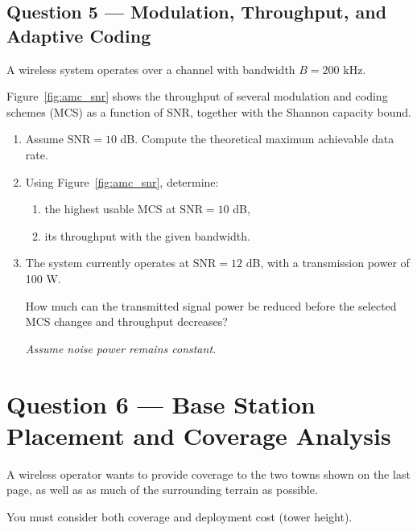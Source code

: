 \documentclass[11pt,a4paper]{article}
\begin{document}
\vspace{0.4cm}

\subsection*{Question 5 --- Modulation, Throughput, and Adaptive Coding}

A wireless system operates over a channel with bandwidth $B = 200$ kHz.

Figure~\ref{fig:amc_snr} shows the throughput of several modulation and coding schemes (MCS) as a function of SNR, together with the Shannon capacity bound.


\FloatBarrier

\begin{enumerate}[label=\alph*)]

\item Assume $\mathrm{SNR} = 10$ dB. Compute the theoretical maximum achievable data rate.

\item Using Figure~\ref{fig:amc_snr}, determine:
\begin{enumerate}[label=\roman*)]
    \item the highest usable MCS at $\mathrm{SNR} = 10$ dB,
    \item its throughput with the given bandwidth.
\end{enumerate}

\item The system currently operates at $\mathrm{SNR} = 12$ dB, with a transmission power of 100 W.

How much can the transmitted signal power be reduced before the selected MCS changes and throughput decreases?

\textit{Assume noise power remains constant.}

\end{enumerate}

\section*{Question 6 --- Base Station Placement and Coverage Analysis}

A wireless operator wants to provide coverage to the two towns shown on the last page, as well as as much of the surrounding terrain as possible.

You must consider both coverage and deployment cost (tower height).
\end{document}
